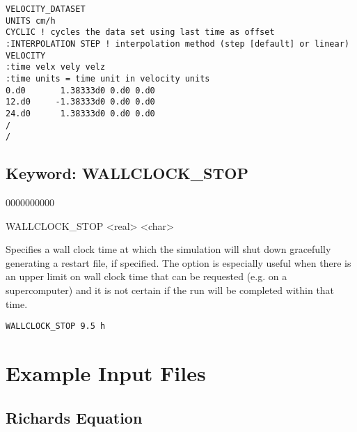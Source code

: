 \documentclass[12pt]{article}
\begin{document}

\begin{verbatim}
VELOCITY_DATASET
UNITS cm/h
CYCLIC ! cycles the data set using last time as offset
:INTERPOLATION STEP ! interpolation method (step [default] or linear)
VELOCITY
:time velx vely velz
:time units = time unit in velocity units
0.d0       1.38333d0 0.d0 0.d0 
12.d0     -1.38333d0 0.d0 0.d0 
24.d0      1.38333d0 0.d0 0.d0 
/
/
\end{verbatim}


\newpage
\protect\hypertarget{target_wallclk}{}

\subsection{Keyword: WALLCLOCK\_STOP}
\begin{deflist}{0000000000}
\item[WALLCLOCK\_STOP] <real> <char>
\end{deflist}

 Specifies a wall clock time at which the simulation will shut down gracefully generating a restart file, if specified. The option is especially useful when there is an upper limit on wall clock time that can be requested (e.g. on a supercomputer) and it is not certain if the run will be completed within that time.

 {\tt WALLCLOCK\_STOP 9.5 h}

\newpage
\section{Example Input Files}

\subsection{Richards Equation}
\end{document}

